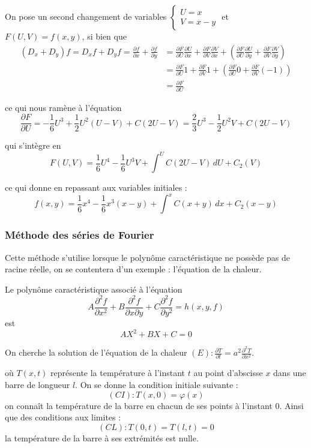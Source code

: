 \documentclass[12pt]{article}
\newcounter{definition}
\newcounter{exemple}
\newcounter{exercice}
\begin{document}
\begin{corrige}
On pose un second changement de variables $\left\{\begin{array}{l}U = x \\ V = x - y\end{array}\right.$ et $F(U, V) = f(x, y)$, si bien que
$$
\begin{aligned}
\left(D_{x} + D_{y}\right) f = D_{x} f + D_{y} f = \frac{\partial f}{\partial x} + \frac{\partial f}{\partial y} & = \frac{\partial F}{\partial U} \frac{\partial U}{\partial x} + \frac{\partial F}{\partial V} \frac{\partial V}{\partial x} + \left(\frac{\partial F}{\partial U} \frac{\partial U}{\partial y} + \frac{\partial F}{\partial V} \frac{\partial V}{\partial y}\right) \\
& = \frac{\partial F}{\partial U} 1 + \frac{\partial F}{\partial V} 1 + \left(\frac{\partial F}{\partial U} 0 + \frac{\partial F}{\partial V}(-1)\right) \\
& = \frac{\partial F}{\partial U}
\end{aligned}
$$

ce qui nous ramène à l'équation
$$
\frac{\partial F}{\partial U} = -\frac{1}{6} U^{3} + \frac{1}{2} U^{2}(U-V) + C(2U-V) = \frac{2}{3} U^{3} - \frac{1}{2} U^{2} V + C(2U-V)
$$

qui s'intègre en
$$
F(U, V) = \frac{1}{6} U^{4} - \frac{1}{6} U^{3} V + \int^{U} C(2U-V)\, dU + C_{2}(V)
$$

ce qui donne en repassant aux variables initiales :
$$
f(x, y) = \frac{1}{6} x^{4} - \frac{1}{6} x^{3}(x-y) + \int^{x} C(x+y)\, dx + C_{2}(x-y)
$$
\end{corrige}

\subsubsection{Méthode des séries de Fourier}

Cette méthode s'utilise lorsque le polynôme caractéristique ne possède pas de racine réelle, on se contentera d'un exemple : l'équation de la chaleur.

\begin{definition}
Le polynôme caractéristique associé à l'équation
$$
A \frac{\partial^{2} f}{\partial x^{2}} + B \frac{\partial^{2} f}{\partial x \partial y} + C \frac{\partial^{2} f}{\partial y^{2}} = h(x, y, f)
$$
est
$$
A X^{2} + BX + C = 0
$$
\end{definition}

\begin{exercice}
On cherche la solution de l'équation de la chaleur $(E): \frac{\partial T}{\partial t} = a^{2} \frac{\partial^{2} T}{\partial x^{2}}$.

où $T(x, t)$ représente la température à l'instant $t$ au point d'abscisse $x$ dans une barre de longueur $l$. On se donne la condition initiale suivante :
$$
(CI): T(x, 0) = \varphi(x)
$$
on connaît la température de la barre en chacun de ses points à l'instant 0. Ainsi que des conditions aux limites :
$$
(CL): T(0, t) = T(l, t) = 0
$$
la température de la barre à ses extrémités est nulle.
\end{exercice}
\end{document}

